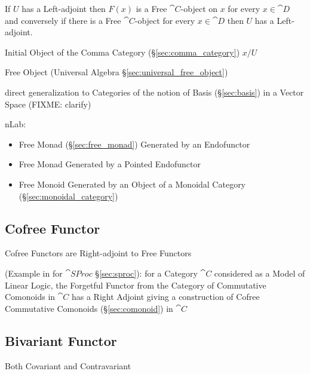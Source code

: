 If $U$ has a Left-adjoint then $F(x)$ is a Free $\cat{C}$-object on
$x$ for every $x \in \cat{D}$ and conversely if there is a Free
$\cat{C}$-object for every $x \in \cat{D}$ then $U$ has a
Left-adjoint.

Initial Object of the Comma Category (\S\ref{sec:comma_category}) $x /
U$

\fist Free Object (Universal Algebra \S\ref{sec:universal_free_object})

direct generalization to Categories of the notion of Basis (\S\ref{sec:basis})
in a Vector Space (FIXME: clarify)

nLab:

\begin{itemize}
  \item Free Monad (\S\ref{sec:free_monad}) Generated by an Endofunctor
  \item Free Monad Generated by a Pointed Endofunctor
  \item Free Monoid Generated by an Object of a Monoidal Category
    (\S\ref{sec:monoidal_category})
\end{itemize}



\subsection{Cofree Functor}\label{sec:cofree_functor}

Cofree Functors are Right-adjoint to Free Functors

(Example in \cite{abramsky-gay-nagarajan96} for $\cat{SProc}$
\S\ref{sec:sproc}): for a Category $\cat{C}$ considered as a Model of
Linear Logic, the Forgetful Functor from the Category of Commutative
Comonoids in $\cat{C}$ has a Right Adjoint giving a construction of
Cofree Commutative Comonoids (\S\ref{sec:comonoid}) in $\cat{C}$



\subsection{Bivariant Functor} \label{sec:bivariant_functor}

Both Covariant and Contravariant

